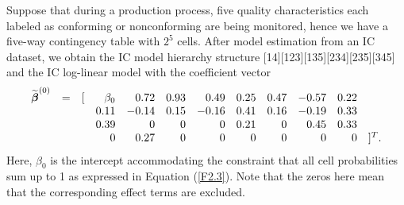 Suppose that during a production process, five quality characteristics each labeled
as conforming or nonconforming are being monitored, hence we have a five-way
contingency table with $2^5$ cells. After model estimation from an IC dataset, we
obtain the IC model hierarchy structure [14][123][135][234][235][345] and the IC
log-linear model with the coefficient vector
\begin{eqnarray}
\begin{array}{rrrrrrrrrrrl}
\widetilde{\boldsymbol\beta}^{(0)} & = & [ & \beta_0 & 0.72 & 0.93
& 0.49 & 0.25 & 0.47 & -0.57 & 0.22 & \\
& & & 0.11 & -0.14 & 0.15 & -0.16 & 0.41 & 0.16 & -0.19 & 0.33 & \\
& & & 0.39 & 0 & 0 & 0 & 0.21 & 0 & 0.45 & 0.33 & \\
& & & 0 & 0.27 & 0 & 0 & 0 & 0 & 0 & 0 & ]^T.
\end{array}
\nonumber
\end{eqnarray}
Here, $\beta_0$ is the intercept accommodating the constraint that all cell
probabilities sum up to 1 as expressed in Equation (\ref{F2.3}). Note that the zeros
here mean that the corresponding effect terms are excluded.

